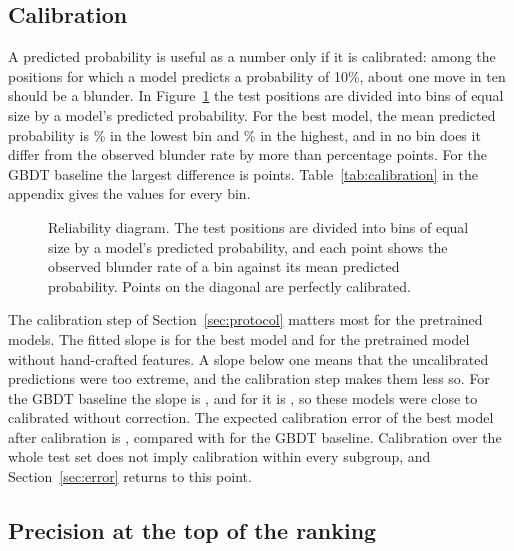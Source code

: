 \documentclass[11pt]{article}
\begin{document}
\subsection{Calibration}

A predicted probability is useful as a number only if it is calibrated: among
the positions for which a model predicts a probability of 10\%, about one
move in ten should be a blunder. In Figure~\ref{fig:calibration} the test
positions are divided into  bins of equal size by
a model's predicted probability. For the best model, the mean predicted
probability is \% in the lowest bin and
\% in the highest, and in no bin does it differ
from the observed blunder rate by more than 
percentage points. For the GBDT baseline the largest difference is
 points. Table~\ref{tab:calibration} in
the appendix gives the values for every bin.

\begin{figure}[htbp]\centering
{}
\caption{Reliability diagram. The test positions are divided into
 bins of equal size by a model's predicted
probability, and each point shows the observed blunder rate of a bin against
its mean predicted probability. Points on the diagonal are perfectly
calibrated.}
\label{fig:calibration}
\end{figure}

The calibration step of Section~\ref{sec:protocol} matters most for the
pretrained models. The fitted slope is  for the best
model and  for the
pretrained model without hand-crafted features. A slope below one means that
the uncalibrated predictions were too extreme, and the calibration step makes
them less so. For the GBDT baseline the slope is
, and for  it is
, so these models were close to
calibrated without correction. The expected calibration error of the best
model after calibration is , compared with
 for the GBDT baseline. Calibration over the
whole test set does not imply calibration within every subgroup, and
Section~\ref{sec:error} returns to this point.

\iflook
\subsection{Precision at the top of the ranking}
\end{document}

